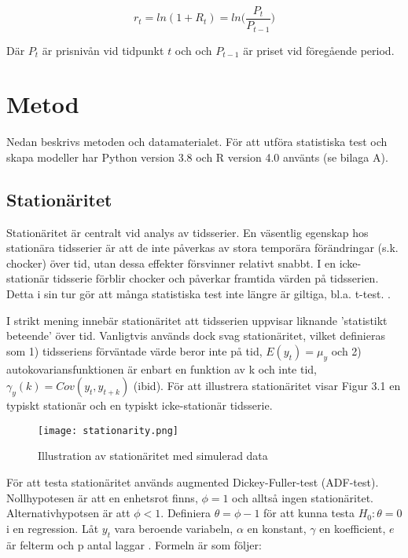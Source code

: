 \documentclass[11pt]{article}
\numberwithin{equation}{section}
\numberwithin{table}{section}
\numberwithin{figure}{section}
\begin{document}
\begin{equation}
    r_{t} = ln(1+R_{t}) = ln \Big( \frac{P_{t}}{P_{t-1}} \Big)
\end{equation}

Där $P_{t}$ är prisnivån vid tidpunkt $t$ och och $P_{t-1}$ är priset vid föregående period. 









\newpage
\section{Metod}
Nedan beskrivs metoden och datamaterialet. För att utföra statistiska test och skapa modeller har Python version 3.8 och R version 4.0 använts (se bilaga A). 

\subsection{Stationäritet}
Stationäritet är centralt vid analys av tidsserier. En väsentlig egenskap hos stationära tidsserier är att de inte påverkas av stora temporära förändringar (s.k. chocker) över tid, utan dessa effekter försvinner relativt snabbt. I en icke-stationär tidsserie förblir chocker och påverkar framtida värden på tidsserien. Detta i sin tur gör att många statistiska test inte längre är giltiga, bl.a. t-test. \parencite[][,s.329 f.]{montgomery2015forecasting}. \par

I strikt mening innebär stationäritet att tidsserien uppvisar liknande 'statistikt beteende' över tid. Vanligtvis används dock svag stationäritet, vilket definieras som 1) tidsseriens förväntade värde beror inte på tid, \(E(y_t)=\mu_y\) och 2) autokovariansfunktionen är enbart en funktion av k och inte tid, \(\gamma_y(k) = Cov(y_t, y_{t+k})\) (ibid). För att illustrera stationäritet visar Figur 3.1 en typiskt stationär och en typiskt icke-stationär tidsserie.

\begin{figure}[H]
\caption{Illustration av stationäritet med simulerad data}
\texttt{[image: stationarity.png]}
\centering
\end{figure}

För att testa stationäritet används augmented Dickey-Fuller-test (ADF-test). Nollhypotesen är att en enhetsrot finns, \(\phi=1\) och alltså ingen stationäritet. Alternativhypotsen är att \(\phi<1\). Definiera \(\theta = \phi -1 \) för att kunna testa \(H_0:\theta=0\) i en regression. Låt \(y_t\) vara beroende variabeln, \( \alpha \) en konstant, \( \gamma \) en koefficient, \(e\) är felterm och p antal laggar \parencite[][,s.610 ff.]{wooldridge2018introductory}. Formeln är som följer:
\end{document}

